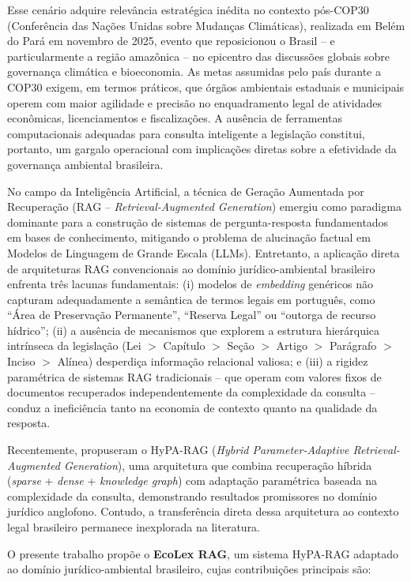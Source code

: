 \documentclass[12pt]{article}
\begin{document}
Esse cenário adquire relevância estratégica inédita no contexto pós-COP30 (Conferência das Nações Unidas sobre Mudanças Climáticas), realizada em Belém do Pará em novembro de 2025, evento que reposicionou o Brasil -- e particularmente a região amazônica -- no epicentro das discussões globais sobre governança climática e bioeconomia. As metas assumidas pelo país durante a COP30 exigem, em termos práticos, que órgãos ambientais estaduais e municipais operem com maior agilidade e precisão no enquadramento legal de atividades econômicas, licenciamentos e fiscalizações. A ausência de ferramentas computacionais adequadas para consulta inteligente a legislação constitui, portanto, um gargalo operacional com implicações diretas sobre a efetividade da governança ambiental brasileira.

No campo da Inteligência Artificial, a técnica de Geração Aumentada por Recuperação (RAG -- \textit{Retrieval-Augmented Generation}) \cite{lewis:2020} emergiu como paradigma dominante para a construção de sistemas de pergunta-resposta fundamentados em bases de conhecimento, mitigando o problema de alucinação factual em Modelos de Linguagem de Grande Escala (LLMs). Entretanto, a aplicação direta de arquiteturas RAG convencionais ao domínio jurídico-ambiental brasileiro enfrenta três lacunas fundamentais: (i) modelos de \textit{embedding} genéricos não capturam adequadamente a semântica de termos legais em português, como ``Área de Preservação Permanente'', ``Reserva Legal'' ou ``outorga de recurso hídrico''; (ii) a ausência de mecanismos que explorem a estrutura hierárquica intrínseca da legislação (Lei $>$ Capítulo $>$ Seção $>$ Artigo $>$ Parágrafo $>$ Inciso $>$ Alínea) desperdiça informação relacional valiosa; e (iii) a rigidez paramétrica de sistemas RAG tradicionais -- que operam com valores fixos de documentos recuperados independentemente da complexidade da consulta -- conduz a ineficiência tanto na economia de contexto quanto na qualidade da resposta.

Recentemente, \cite{kalra:2024} propuseram o HyPA-RAG (\textit{Hybrid Parameter-Adaptive Retrieval-Augmented Generation}), uma arquitetura que combina recuperação híbrida (\textit{sparse} + \textit{dense} + \textit{knowledge graph}) com adaptação paramétrica baseada na complexidade da consulta, demonstrando resultados promissores no domínio jurídico anglofono. Contudo, a transferência direta dessa arquitetura ao contexto legal brasileiro permanece inexplorada na literatura.

O presente trabalho propõe o \textbf{EcoLex RAG}, um sistema HyPA-RAG adaptado ao domínio jurídico-ambiental brasileiro, cujas contribuições principais são:
\end{document}
